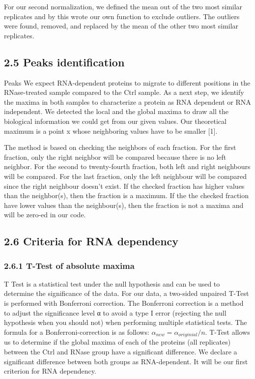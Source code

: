 \documentclass[
]{article}
\begin{document}
For our second normalization, we defined the mean out of the two most
similar replicates and by this wrote our own function to exclude
outliers. The outliers were found, removed, and replaced by the mean of
the other two most similar replicates.

\hypertarget{peaks-identification}{%
\subsection{2.5 Peaks identification}\label{peaks-identification}}

Peaks We expect RNA-dependent proteins to migrate to different positions
in the RNase-treated sample compared to the Ctrl sample. As a next step,
we identify the maxima in both samples to characterize a protein as RNA
dependent or RNA independent. We detected the local and the global
maxima to draw all the biological information we could get from our
given values. Our theoretical maximum is a point x whose neighboring
values have to be smaller {[}1{]}.

The method is based on checking the neighbors of each fraction. For the
first fraction, only the right neighbor will be compared because there
is no left neighbor. For the second to twenty-fourth fraction, both left
and right neighbours will be compared. For the last fraction, only the
left neighbour will be compared since the right neighbour doesn't exist.
If the checked fraction has higher values than the neighbor(s), then the
fraction is a maximum. If the the checked fraction have lower values
than the neighbour(s), then the fraction is not a maxima and will be
zero-ed in our code.

\hypertarget{criteria-for-rna-dependency}{%
\subsection{2.6 Criteria for RNA
dependency}\label{criteria-for-rna-dependency}}

\hypertarget{t-test-of-absolute-maxima}{%
\subsubsection{2.6.1 T-Test of absolute
maxima}\label{t-test-of-absolute-maxima}}

T Test is a statistical test under the null hypothesis and can be used
to determine the significance of the data. For our data, a two-sided
unpaired T-Test is performed with Bonferroni correction. The Bonferroni
correction is a method to adjust the significance level α to avoid a
type I error (rejecting the null hypothesis when you should not) when
performing multiple statistical tests. The formula for a
Bonferroni-correction is as follows: \(α_{new} = α_{originial} / n\).
T-Test allows us to determine if the global maxima of each of the
proteins (all replicates) between the Ctrl and RNase group have a
significant difference. We declare a significant difference between both
groups as RNA-dependent. It will be our first criterion for RNA
dependency.
\end{document}
